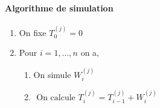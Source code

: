 \paragraph{Algorithme de simulation}
\begin{enumerate}
    \item On fixe $T_0^{(j)} = 0$
    \item Pour $i = 1,...,n$ on a,
        \begin{enumerate}[label=2.\arabic*]
        \item On simule $W_i^{(j)}$
        \item $\text { On calcule } T_{i}^{(j)}=T_{i-1}^{(j)}+W_{i}^{(j)} $
        \end{enumerate}
\end{enumerate}
